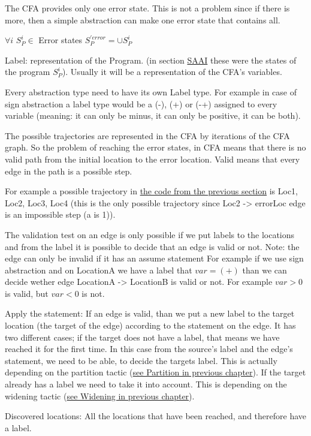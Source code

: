 The CFA provides only one error state. This is not a problem since if there is more, then a simple abstraction can make one error state that contains all.

$\forall i$ $S_{P}^{i} \in $ Error states $S_{P}^{'error}=\cup S_{P}^{i}$

Label: representation of the Program. (in section \hyperref[sec:saai]{SAAI} these were the states of the program  $S_{P}^{i}$). Usually it will be a representation of the CFA's variables.

Every abstraction type need to have its own Label type. For example in case of sign abstraction a label type would be a (-), (+) or (-+) assigned to every variable (meaning: it can only be minus, it can only be positive, it can be both).

The possible trajectories are represented in the CFA by iterations of the CFA graph. So the problem of reaching the error states, in CFA means that there is no valid path from the initial location to the error location. Valid means that every edge in the path is a possible step.

For example a possible trajectory in \hyperref[fig:simpleC]{the code from the previous section} is Loc1, Loc2, Loc3, Loc4 (this is the only possible trajectory since Loc2 -> errorLoc edge is an impossible step (a is 1)).

The validation test on an edge is only possible if we put labels to the locations and from the label it is possible to decide that an edge is valid or not. Note: the edge can only be invalid if it has an assume statement
For example if we use sign abstraction and on LocationA we have a label that $var=(+)$ than we can decide wether edge LocationA -> LocationB is valid or not. For example $var>0$ is valid, but $var<0$ is not.

Apply the statement:
If an edge is valid, than we put a new label to the target location (the target of the edge) according to the statement on the edge.
It has two different cases; if the target does not have a label, that means we have reached it for the first time. In this case from the source's label and the edge's statement, we need to be able, to decide the targets label. This is actually depending on the partition tactic (\hyperref[sec:partition]{see Partition in previous chapter}).
If the target already has a label we need to take it into account. This is depending on the widening tactic (\hyperref[sec:widening]{see Widening in previous chapter}).  

Discovered locations:
All the locations that have been reached, and therefore have a label.


